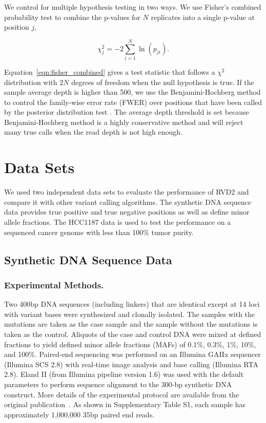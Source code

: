 \documentclass{bioinfo}
\begin{document}
We control for multiple hypothesis testing in two ways. We use Fisher's combined probability test \citep{fisher1970statistical} to combine the p-values for $N$ replicates into a single p-value at position $j$,

\begin{equation}\label{eqn:fisher_combined}
	\chi_j^2 = -2 \sum_{i=1}^N \ln(p_{ji}).
\end{equation}

Equation~\eqref{eqn:fisher_combined} gives a test statistic that follows a $\chi^2$ distribution with $2N$ degrees of freedom when the null hypothesis is true. If the sample average depth is higher than 500, we use the Benjamini-Hochberg method to control the family-wise error rate (FWER) over positions that have been called by the posterior distribution test \citep{benjamini1995controlling, efron2010large}. The average depth threshold is set because Benjamini-Hochberg method is a highly conservative method and will reject many true calls when the read depth is not high enough.

\section{Data Sets}

We used two independent data sets to evaluate the performance of RVD2 and compare it with other variant calling algorithms. The synthetic DNA sequence data provides true positive and true negative positions as well as define minor allele fractions. The HCC1187 data is used to test the performance on a sequenced cancer genome with less than 100\% tumor purity.

\subsection{Synthetic DNA Sequence Data}

\subsubsection*{Experimental Methods.}
Two 400bp DNA sequences (including linkers) that are identical except at 14 loci with variant bases were synthesized and clonally isolated.
The samples with the mutations are taken as the case sample and the sample without the mutations is taken as the control. 
Aliquots of the case and control DNA were mixed at defined fractions to yield defined minor allele fractions (MAFs) of 0.1\%, 0.3\%, 1\%, 10\%, and 100\%. 
Paired-end sequencing was performed on an Illumina GAIIx sequencer (Illumina SCS 2.8) with real-time image analysis and base calling (Illumina RTA 2.8). 
Eland II (from Illumina pipeline version 1.6) was used with the default parameters to perform sequence alignment to the 300-bp synthetic DNA construct.
More details of the experimental protocol are available from the original publication~\citep{Flaherty:2011ja}.
As shown in Supplementary Table S1, each sample has approximately 1,000,000 35bp paired end reads.
\end{document}
